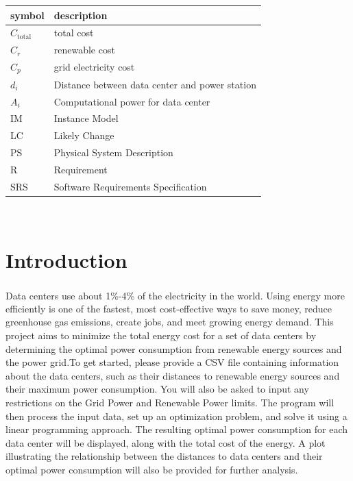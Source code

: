 \documentclass[12pt]{article}
\begin{document}
\renewcommand{\arraystretch}{1.2}
\begin{tabular}{l l} 
  \toprule		
  \textbf{symbol} & \textbf{description}\\
  \midrule 
 $C_\text{total}$ & total cost\\
  $C_r$ & renewable cost\\
  $C_p$ & grid electricity cost\\
  $d_i$ & Distance between data center and power station\\
  $A_i$ & Computational power for data center\\
  IM & Instance Model\\
  LC & Likely Change\\
  PS & Physical System Description\\
  R & Requirement\\
  SRS & Software Requirements Specification\\

  \bottomrule
\end{tabular}\\



 



\newpage
\section{Introduction}
Data centers use about 1\%-4\% of the electricity in the world\textsuperscript{\cite{rivier2013electricity}}. Using energy more efficiently is one of the fastest, most cost-effective ways to save money, reduce greenhouse gas emissions, create jobs, and meet growing energy demand. This project aims to minimize the total energy cost for a set of data centers by determining the optimal power consumption from renewable energy sources and the power grid.To get started, please provide a CSV file containing information about the data centers, such as their distances to renewable energy sources and their maximum power consumption. You will also be asked to input any restrictions on the Grid Power and Renewable Power limits.
The program will then process the input data, set up an optimization problem, and solve it using a linear programming approach. The resulting optimal power consumption for each data center will be displayed, along with the total cost of the energy. A plot illustrating the relationship between the distances to data centers and their optimal power consumption will also be provided for further analysis.
\end{document}

